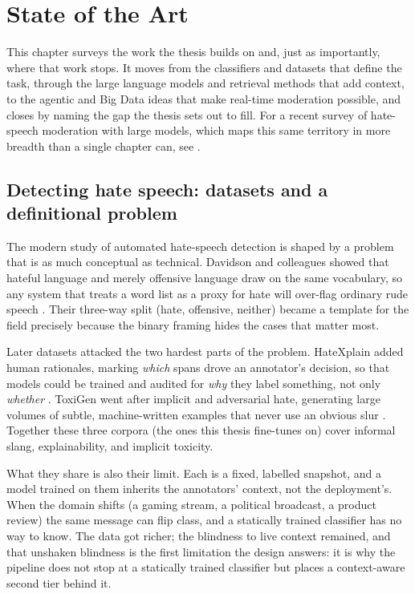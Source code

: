 \chapter{State of the Art}\label{state-of-the-art}

This chapter surveys the work the thesis builds on and, just as importantly, where that work stops. It moves from the classifiers and datasets that define the task, through the large language models and retrieval methods that add context, to the agentic and Big Data ideas that make real-time moderation possible, and closes by naming the gap the thesis sets out to fill. For a recent survey of hate-speech moderation with large models, which maps this same territory in more breadth than a single chapter can, see \citet{hatesurvey2024}.

\section{Detecting hate speech: datasets and a definitional problem}\label{detecting-hate-speech-datasets-and-a-definitional-problem}

The modern study of automated hate-speech detection is shaped by a problem that is as much conceptual as technical. Davidson and colleagues showed that hateful language and merely offensive language draw on the same vocabulary, so any system that treats a word list as a proxy for hate will over-flag ordinary rude speech \citep{davidson2017}. Their three-way split (hate, offensive, neither) became a template for the field precisely because the binary framing hides the cases that matter most.

Later datasets attacked the two hardest parts of the problem. HateXplain added human rationales, marking \emph{which} spans drove an annotator's decision, so that models could be trained and audited for \emph{why} they label something, not only \emph{whether} \citep{hatexplain2021}. ToxiGen went after implicit and adversarial hate, generating large volumes of subtle, machine-written examples that never use an obvious slur \citep{toxigen2022}. Together these three corpora (the ones this thesis fine-tunes on) cover informal slang, explainability, and implicit toxicity.

What they share is also their limit. Each is a fixed, labelled snapshot, and a model trained on them inherits the annotators' context, not the deployment's. When the domain shifts (a gaming stream, a political broadcast, a product review) the same message can flip class, and a statically trained classifier has no way to know. The data got richer; the blindness to live context remained, and that unshaken blindness is the first limitation the design answers: it is why the pipeline does not stop at a statically trained classifier but places a context-aware second tier behind it.

